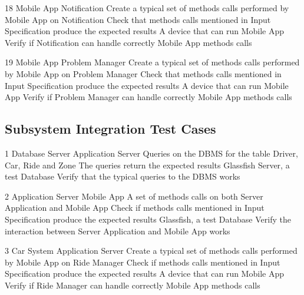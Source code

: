\testCase
	{18}
	{Mobile App}
	{Notification}
	{Create a typical set of methods calls performed by Mobile App on Notification}
	{Check that methods calls mentioned in Input Specification produce the expected results}
	{A device that can run Mobile App}
	{Verify  if Notification can handle correctly Mobile App methods calls}

\testCase
	{19}
	{Mobile App}
	{Problem Manager}
	{Create a typical set of methods calls performed by Mobile App on Problem Manager}
	{Check that methods calls mentioned in Input Specification produce the expected results}
	{A device that can run Mobile App}
	{Verify  if Problem Manager can handle correctly Mobile App methods calls}

\subsection{Subsystem Integration Test Cases}
\testCaseSub
	{1}
	{Database Server}
	{Application Server}
	{Queries on the DBMS for the table Driver, Car, Ride and Zone}
	{The queries return the expected results}
	{Glassfish Server, a test Database}
	{Verify that the typical queries to the DBMS  works}

\testCaseSub
	{2}
	{Application Server}
	{Mobile App}
	{A set of methods calls on both Server Application and Mobile App }
	{Check if methods calls mentioned in Input Specification produce the expected results}
	{Glassfish, a test Database}
	{Verify the interaction between Server Application and Mobile App works}



\testCaseSub
	{3}
	{Car System}
	{Application Server}
	{Create a typical set of methods calls performed by Mobile App on Ride Manager}
	{Check if methods calls mentioned in Input Specification produce the expected results}
	{A device that can run Mobile App}
	{Verify  if Ride Manager can handle correctly Mobile App methods calls}
